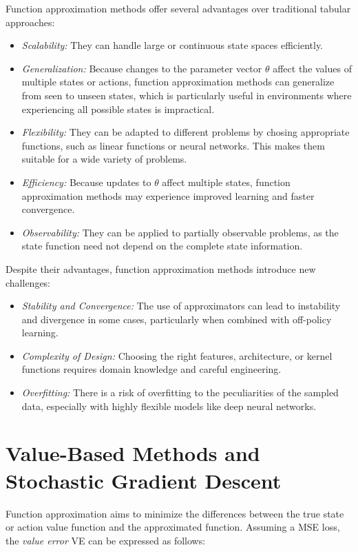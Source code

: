 Function approximation methods offer several advantages over traditional tabular approaches:
\begin{itemize}
\item \emph{Scalability:} They can handle large or continuous state spaces efficiently.
\item \emph{Generalization:} Because changes to the parameter vector $\theta$ affect the values of multiple states or actions, function approximation methods can generalize from seen to unseen states, which is particularly useful in environments where experiencing all possible states is impractical.
\item \emph{Flexibility:} They can be adapted to different problems by chosing appropriate functions, such as linear functions or neural networks. This makes them suitable for a wide variety of problems.
\item \emph{Efficiency:} Because updates to $\theta$ affect multiple states, function approximation methods may experience improved learning and faster convergence.
\item \emph{Observability:} They can be applied to partially observable problems, as the state function need not depend on the complete state information. 
\end{itemize}

Despite their advantages, function approximation methods introduce new challenges:
\begin{itemize}
\item \emph{Stability and Convergence:} The use of approximators can lead to instability and divergence in some cases, particularly when combined with off-policy learning.
\item \emph{Complexity of Design:} Choosing the right features, architecture, or kernel functions requires domain knowledge and careful engineering.
\item \emph{Overfitting:} There is a risk of overfitting to the peculiarities of the sampled data, especially with highly flexible models like deep neural networks.
\end{itemize}

\section{Value-Based Methods and Stochastic Gradient Descent}

Function approximation aims to minimize the differences between the true state or action value function and the approximated function. Assuming a MSE loss, the \emph{value error} VE can be expressed as follows:

